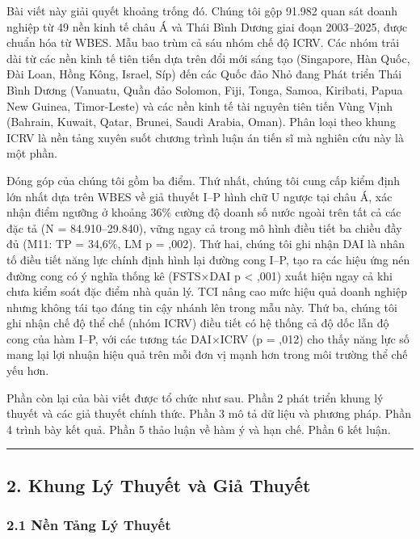 \documentclass[12pt,a4paper]{article}
\begin{document}
Bài viết này giải quyết khoảng trống đó. Chúng tôi gộp 91.982 quan sát
doanh nghiệp từ 49 nền kinh tế châu Á và Thái Bình Dương giai đoạn
2003--2025, được chuẩn hóa từ WBES. Mẫu bao trùm cả sáu nhóm chế độ
ICRV. Các nhóm trải dài từ các nền kinh tế tiên tiến dựa trên đổi mới
sáng tạo (Singapore, Hàn Quốc, Đài Loan, Hồng Kông, Israel, Síp) đến các
Quốc đảo Nhỏ đang Phát triển Thái Bình Dương (Vanuatu, Quần đảo Solomon,
Fiji, Tonga, Samoa, Kiribati, Papua New Guinea, Timor-Leste) và các nền
kinh tế tài nguyên tiên tiến Vùng Vịnh (Bahrain, Kuwait, Qatar, Brunei,
Saudi Arabia, Oman). Phân loại theo khung ICRV là nền tảng xuyên suốt
chương trình luận án tiến sĩ mà nghiên cứu này là một phần.

Đóng góp của chúng tôi gồm ba điểm. Thứ nhất, chúng tôi cung cấp kiểm
định lớn nhất dựa trên WBES về giả thuyết I--P hình chữ U ngược tại châu
Á, xác nhận điểm ngưỡng ở khoảng 36\% cường độ doanh số nước ngoài trên
tất cả các đặc tả (N = 84.910--29.840), vững ngay cả trong mô hình điều
tiết ba chiều đầy đủ (M11: TP = 34,6\%, LM p = ,002). Thứ hai, chúng tôi
ghi nhận DAI là nhân tố điều tiết năng lực chính định hình lại đường
cong I--P, tạo ra các hiệu ứng nén đường cong có ý nghĩa thống kê
(FSTS×DAI p \textless{} ,001) xuất hiện ngay cả khi chưa kiểm soát đặc
điểm nhà quản lý. TCI nâng cao mức hiệu quả doanh nghiệp nhưng không tái
tạo đáng tin cậy nhánh lên trong mẫu này. Thứ ba, chúng tôi ghi nhận chế
độ thể chế (nhóm ICRV) điều tiết có hệ thống cả độ dốc lẫn độ cong của
hàm I--P, với các tương tác DAI×ICRV (p = ,012) cho thấy năng lực số
mang lại lợi nhuận hiệu quả trên mỗi đơn vị mạnh hơn trong môi trường
thể chế yếu hơn.

Phần còn lại của bài viết được tổ chức như sau. Phần 2 phát triển khung
lý thuyết và các giả thuyết chính thức. Phần 3 mô tả dữ liệu và phương
pháp. Phần 4 trình bày kết quả. Phần 5 thảo luận về hàm ý và hạn chế.
Phần 6 kết luận.

\begin{center}\rule{0.5\linewidth}{0.5pt}\end{center}

\hypertarget{2-khung-luxfd-thuyux1ebft-vuxe0-giux1ea3-thuyux1ebft}{%
\subsection{2. Khung Lý Thuyết và Giả
Thuyết}\label{2-khung-luxfd-thuyux1ebft-vuxe0-giux1ea3-thuyux1ebft}}

\hypertarget{21-nux1ec1n-tux1ea3ng-luxfd-thuyux1ebft}{%
\subsubsection{2.1 Nền Tảng Lý
Thuyết}\label{21-nux1ec1n-tux1ea3ng-luxfd-thuyux1ebft}}
\end{document}
